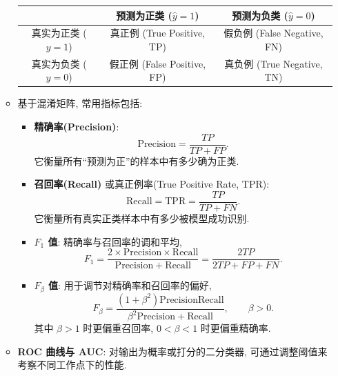 \documentclass{../nndlcourse}
\begin{document}
\begin{enumerate}
\begin{itemize}
        \begin{center}
        \begin{tabular}{|c|c|c|}
        \hline
         & 预测为正类 ($\hat{y} = 1$) & 预测为负类 ($\hat{y} = 0$) \\
        \hline
        真实为正类 ($y = 1$) & 真正例 (True Positive, TP) & 假负例 (False Negative, FN) \\
        \hline
        真实为负类 ($y = 0$) & 假正例 (False Positive, FP) & 真负例 (True Negative, TN) \\
        \hline
        \end{tabular}
        \end{center}
        \item 基于混淆矩阵, 常用指标包括:
        \begin{itemize}
            \item \textbf{精确率(Precision)}:
            \begin{equation*}
                \mathrm{Precision} = \frac{TP}{TP + FP}.
            \end{equation*}
            它衡量所有“预测为正”的样本中有多少确为正类.
            \item \textbf{召回率(Recall)} 或真正例率(True Positive Rate, TPR):
            \begin{equation*}
                \mathrm{Recall} = \mathrm{TPR} = \frac{TP}{TP + FN}.
            \end{equation*}
            它衡量所有真实正类样本中有多少被模型成功识别.
            \item \textbf{$F_1$ 值}: 精确率与召回率的调和平均,
            \begin{equation*}
                F_1 = \frac{2 \times \mathrm{Precision} \times \mathrm{Recall}}{\mathrm{Precision} + \mathrm{Recall}}
                = \frac{2TP}{2TP + FP + FN}.
            \end{equation*}
            \item \textbf{$F_\beta$ 值}: 用于调节对精确率和召回率的偏好,
            \begin{equation*}
                F_\beta = \frac{(1 + \beta^2)\mathrm{Precision}\mathrm{Recall}}{\beta^2 \mathrm{Precision} + \mathrm{Recall}},
                \qquad \beta > 0.
            \end{equation*}
            其中 $\beta > 1$ 时更偏重召回率, $0 < \beta < 1$ 时更偏重精确率.
        \end{itemize}
        \item \textbf{ROC 曲线与 AUC}: 对输出为概率或打分的二分类器, 可通过调整阈值来考察不同工作点下的性能.

\end{itemize}
\end{enumerate}
\end{document}
